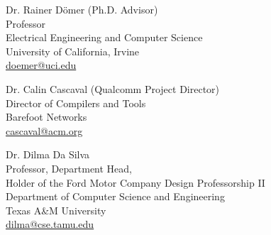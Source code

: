 

%
%
\vspace{2mm}

Dr. Rainer D\"{o}mer (Ph.D. Advisor) \\
Professor\\
Electrical Engineering and Computer Science\\
University of California, Irvine\\
\href{mailto:doemer@uci.edu}{doemer@uci.edu}\\

\vspace{5mm}

Dr. Calin Cascaval (Qualcomm Project Director)\\
Director of Compilers and Tools\\
Barefoot Networks \\
\href{mailto:cascaval@acm.org}{cascaval@acm.org}\\

\vspace{5mm}

Dr. Dilma Da Silva \\
Professor, Department Head, \\
Holder of the Ford Motor Company Design Professorship II \\
Department of Computer Science and Engineering \\
Texas A\&M University \\
\href{mailto:dilma@cse.tamu.edu}{dilma@cse.tamu.edu}\\


